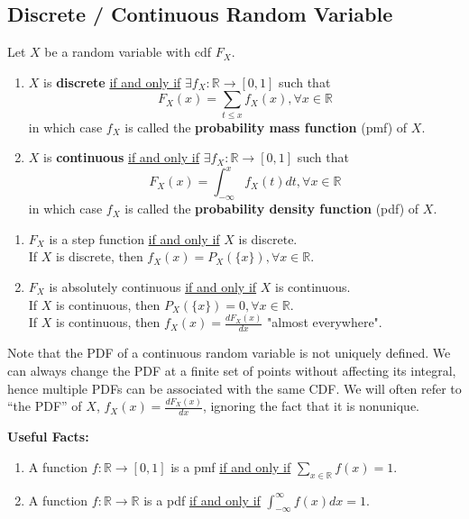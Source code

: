 \documentclass[11pt]{elegantbook}
\begin{document}
\subsection{Discrete / Continuous Random Variable}
\begin{definition}
    \normalfont
    Let $X$ be a random variable with cdf $F_X$.
    \begin{enumerate}[$\circ$]
        \item $X$ is \textbf{discrete} \underline{if and only if} $\exists f_X: \mathbb{R} \rightarrow [0,1]$ such that $$F_X(x)=\sum_{t\leq x}f_X(x), \forall x\in \mathbb{R}$$
        in which case $f_X$ is called the \textbf{probability mass function} (pmf) of $X$.
        \item $X$ is \textbf{continuous} \underline{if and only if} $\exists f_X: \mathbb{R} \rightarrow [0,1]$ such that $$F_X(x)=\int_{-\infty}^x f_X(t)dt, \forall x\in \mathbb{R}$$
        in which case $f_X$ is called the \textbf{probability density function} (pdf) of $X$.
    \end{enumerate}
\end{definition}
\begin{proposition}
    \begin{enumerate}[$\circ$]
        \item $F_X$ is a step function \underline{if and only if} $X$ is discrete.\\
        If $X$ is discrete, then $f_X(x)=P_X(\{x\}), \forall x\in \mathbb{R}$.
        \item $F_X$ is absolutely continuous \underline{if and only if} $X$ is continuous.\\
        If $X$ is continuous, then $P_X(\{x\})=0, \forall x\in \mathbb{R}$.\\
        If $X$ is continuous, then $f_X(x)=\frac{d F_X(x)}{d x}$ "almost everywhere".
    \end{enumerate}
\end{proposition}
\begin{note}
    Note that the PDF of a continuous random variable is not uniquely defined. We can always change the PDF at a finite set of points without affecting its integral, hence multiple PDFs can be associated with the same CDF. We will often refer to ``the PDF'' of $X$, $f_X(x)=\frac{d F_X(x)}{d x}$, ignoring the fact that it is nonunique.
\end{note}



\begin{note}
    \textbf{Useful Facts:}
    \begin{enumerate}
        \item A function $f: \mathbb{R} \rightarrow [0,1]$ is a pmf \underline{if and only if} $\sum_{x\in \mathbb{R}}f(x)=1$.
        \item A function $f: \mathbb{R} \rightarrow \mathbb{R}$ is a pdf \underline{if and only if} $\int_{-\infty}^\infty f(x) dx=1$.
    \end{enumerate}
\end{note}
\end{document}
